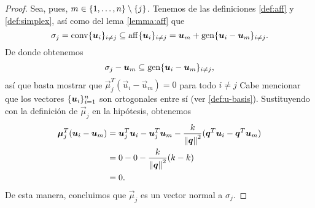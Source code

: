 \begin{proof}
	Sea, pues, $m \in \lbrace 1, \ldots, n \rbrace \setminus \lbrace j \rbrace$. Tenemos de las definiciones
	\ref{def:aff} y \ref{def:simplex}, así como del lema \ref{lemma:aff} que
	\begin{equation*}
		\sigma_j = \operatorname{conv}\lbrace \boldsymbol{u}_i \rbrace_{i \neq j} \subseteq
		\operatorname{aff}\lbrace \boldsymbol{u}_i \rbrace_{i \neq j}
		= \boldsymbol{u}_m + \operatorname{gen}\lbrace \boldsymbol{u}_i - \boldsymbol{u}_m \rbrace_{i \neq j}.
	\end{equation*}
	De donde obtenemos
	\begin{equation*}
		\sigma_j - \boldsymbol{u}_m \subseteq \operatorname{gen}\lbrace \boldsymbol{u}_i - \boldsymbol{u}_m \rbrace_{i \neq j},
	\end{equation*}
	así que basta mostrar que $\vec{\mu}_j^T(\vec{u}_i - \vec{u}_m) = 0$ para todo $i \neq j$ Cabe
	mencionar que los vectores $\lbrace \boldsymbol{u}_i \rbrace_{i=1}^{n}$ son ortogonales entre sí (ver
	\eqref{def:u-basis}). Sustituyendo con la definición de $\vec{\mu}_j$ en la hipótesis, obtenemos
	\begin{align*}
		\boldsymbol{\mu}_j^T(\boldsymbol{u}_i - \boldsymbol{u}_m)
		&=
		\boldsymbol{u}_j^T\boldsymbol{u}_i - \boldsymbol{u}_j^T\boldsymbol{u}_m - \frac{k}{\left\lVert \boldsymbol{q} \right\rVert^2}(\boldsymbol{q}^T\boldsymbol{u}_i
		- \boldsymbol{q}^T\boldsymbol{u}_m) \\
		&= 0 - 0 -\frac{k}{\left\lVert \boldsymbol{q} \right\rVert^2}(k - k) \\
		&= 0.
	\end{align*}
	De esta manera, concluimos que $\vec{\mu}_j$ es un vector normal a $\sigma_j$.
\end{proof}


